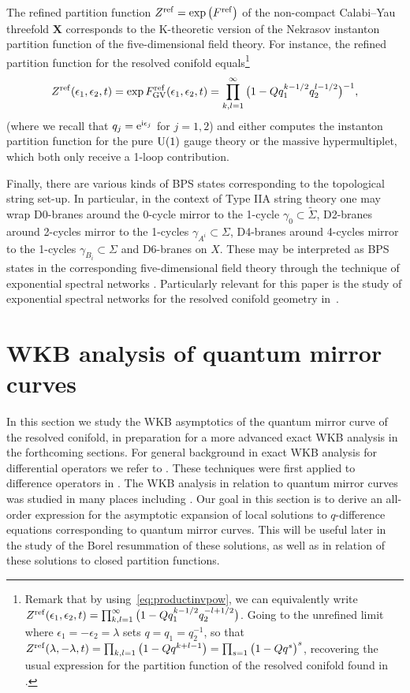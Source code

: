 \documentclass[pdftex]{sigma}
\numberwithin{equation}{section}
\begin{document}
The refined partition function $Z^{\rm ref} = \exp \big(F^{\rm ref}\big)$ of the non-compact Calabi--Yau threefold $\mathbf{X}$ corresponds to the K-theoretic version of the Nekrasov instanton partition function of the five-dimensional field theory. For instance, the refined partition function for the resolved conifold equals\footnote{Remark that by using~\eqref{eq:productinvpow}, we can equivalently write $Z^{\rm ref}( \epsilon_1,\epsilon_2,t) = \prod_{k,l=1}^\infty \big(1- Q q_1^{k-1/2} q_2^{-l+1/2} \big)$. Going to the unrefined limit where $\epsilon_1=-\epsilon_2=\lambda$ sets $q=q_1=q_2^{-1}$, so that
 $Z^{\rm ref}(\lambda,-\lambda,t)=\prod_{k,l=1}\big(1-Q q^{k+l-1}\big)=\prod_{s=1}\big(1-Q q^s\big)^s $,
recovering the usual expression for the partition function of the resolved conifold found in \cite{IKV}.}
\begin{align}\label{eqn:one-loop}
 Z^{\rm ref}( \epsilon_1,\epsilon_2,t) = \exp F_\mathrm{GV}^{\rm ref}( \epsilon_1,\epsilon_2,t) = \prod_{k,l=1}^\infty \big(1- Q q_1^{k-1/2} q_2^{l-1/2} \big)^{-1},
\end{align}
(where we recall that $q_j={\rm e}^{\mathrm{i}\epsilon_j}$ for $j=1,2$)
and either computes the instanton partition function for the pure ${\rm U}(1)$ gauge theory or the massive hypermultiplet, which both only receive a 1-loop contribution.

Finally, there are various kinds of BPS states corresponding to the topological string set-up. In particular, in the context of Type IIA string theory one may wrap D0-branes around the 0-cycle mirror to the 1-cycle $\gamma_0 \subset \widetilde{\Sigma}$, D2-branes around 2-cycles mirror to the 1-cycles $\gamma_{A^i} \subset \Sigma$, D4-branes around 4-cycles mirror to the 1-cycles $\gamma_{B_i} \subset \Sigma$ and D6-branes on $X$. These may be interpreted as BPS states in the corresponding five-dimensional field theory through the technique of exponential spectral networks \cite{Banerjee:2018syt, Eager:2016yxd}. Particularly relevant for this paper is the study of exponential spectral networks for the resolved conifold geometry in~\cite{BLR}.

\section{WKB analysis of quantum mirror curves}\label{sec:qmirrorcurve}

In this section we study the WKB asymptotics of the quantum mirror curve of the resolved conifold, in preparation for a more advanced exact WKB analysis in the forthcoming sections. For general background in exact WKB analysis for differential operators we refer to \cite{NI, Takeireview}. These techniques were first applied to difference operators in \cite{DingleMorganI,DingleMorganII}. The WKB analysis in relation to quantum mirror curves was studied in many places including \cite{ACDKV,Kashani-Poor:2016edc}.
Our goal in this section is to derive an all-order expression for the asymptotic expansion of local solutions to $q$-difference equations corresponding to quantum mirror curves. This will be useful later in the study of the Borel resummation of these solutions, as well as in relation of these solutions to closed partition functions.
\end{document}
